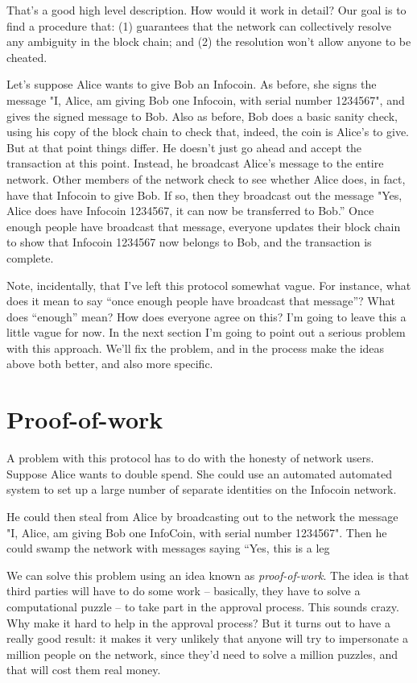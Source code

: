 \documentclass[12pt]{book}
\newcounter{problem}[chapter]
\begin{document}
That's a good high level description.  How would it work in detail?
Our goal is to find a procedure that: (1) guarantees that the network
can collectively resolve any ambiguity in the block chain; and (2) the
resolution won't allow anyone to be cheated.

Let's suppose Alice wants to give Bob an Infocoin.  As before, she
signs the message "I, Alice, am giving Bob one Infocoin, with serial
number 1234567", and gives the signed message to Bob.  Also as before,
Bob does a basic sanity check, using his copy of the block chain to
check that, indeed, the coin is Alice's to give.  But at that point
things differ.  He doesn't just go ahead and accept the transaction at
this point.  Instead, he broadcast Alice's message to the entire
network.  Other members of the network check to see whether Alice
does, in fact, have that Infocoin to give Bob.  If so, then they
broadcast out the message "Yes, Alice does have Infocoin 1234567, it
can now be transferred to Bob.''  Once enough people have broadcast
that message, everyone updates their block chain to show that Infocoin
1234567 now belongs to Bob, and the transaction is complete.

Note, incidentally, that I've left this protocol somewhat vague.  For
instance, what does it mean to say ``once enough people have broadcast
that message''?  What does ``enough'' mean?  How does everyone agree
on this?  I'm going to leave this a little vague for now.  In the next
section I'm going to point out a serious problem with this approach.
We'll fix the problem, and in the process make the ideas above both
better, and also more specific.


\section{Proof-of-work}

A problem with this protocol has to do with the honesty of network
users.  Suppose Alice wants to double spend.  She could use an
automated automated system to set up a large number of separate
identities on the Infocoin network. 

 He could then steal from Alice by
broadcasting out to the network the message "I, Alice, am giving Bob
one InfoCoin, with serial number 1234567".  Then he could swamp the
network with messages saying ``Yes, this is a leg

We can solve this problem using an idea known as \emph{proof-of-work}.
The idea is that third parties will have to do some work -- basically,
they have to solve a computational puzzle -- to take part in the
approval process.  This sounds crazy.  Why make it hard to help in the
approval process?  But it turns out to have a really good result: it
makes it very unlikely that anyone will try to impersonate a million
people on the network, since they'd need to solve a million puzzles,
and that will cost them real money.
\end{document}
